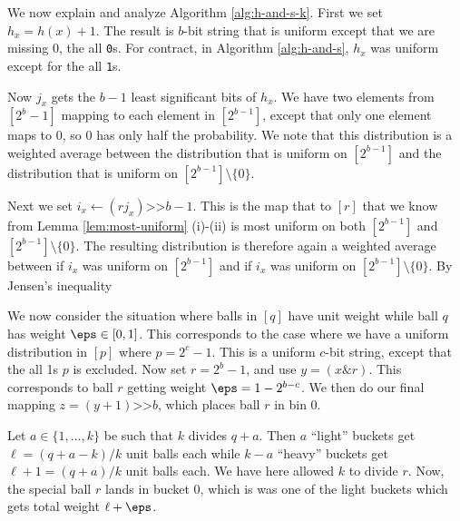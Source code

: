 We now explain and analyze Algorithm \ref{alg:h-and-s-k}. First we set
$h_x=h(x)+1$.  The result is $b$-bit string that is uniform except
that we are missing 0, the all \texttt0s. For contract, in Algorithm
\ref{alg:h-and-s}, $h_x$ was uniform except for the all
\texttt1s. 

Now $j_x$ gets the $b-1$ least significant bits of
$h_x$. We have two elements from $[2^b-1]$ mapping to each element in
$[2^{b-1}]$, except that only one element maps to $0$, so $0$ has only
half the probability. We note that this distribution is a weighted
average between the distribution that is uniform on $[2^{b-1}]$ and
the distribution that is uniform on $[2^{b-1}]\setminus\{0\}$.

Next we set $i_x\gets (rj_x)\texttt{>>}b-1$. This is the map that
to $[r]$ that we know from Lemma \ref{lem:most-uniform} (i)-(ii) 
is most uniform on both $[2^{b-1}]$ and $[2^{b-1}]\setminus\{0\}$.
The resulting distribution is therefore again a weighted average
between if $i_x$ was uniform on $[2^{b-1}]$ and
if $i_x$ was uniform on $[2^{b-1}]\setminus\{0\}$. By Jensen's inequality





We now consider the situation where balls in $[q]$ have unit weight while ball $q$
has weight $\eps\in[0,1]$. This corresponds to the case where we have a uniform
distribution in $[p]$ where $p=2^c-1$. This is a uniform $c$-bit string, except
that the all 1s $p$ is excluded. Now set $r=2^b-1$, and use $y=(x\texttt{\&} r)$.
This corresponds to ball $r$ getting weight $\eps=1-2^{b-c}$. We then do
our final mapping $z=(y+1)\texttt{>>} b$, which places ball $r$ in bin $0$.

Let $a\in\{1,\ldots,k\}$ be such that $k$ divides $q+a$. Then $a$ ``light'' buckets
get $\ell=(q+a-k)/k$ unit balls each while $k-a$ ``heavy'' buckets 
get $\ell+1=(q+a)/k$ unit balls each. We have here allowed $k$ to divide $r$.
Now, the special ball $r$ lands in bucket 0, which is was one of
the light buckets which gets total weight $\ell+\eps$. 


